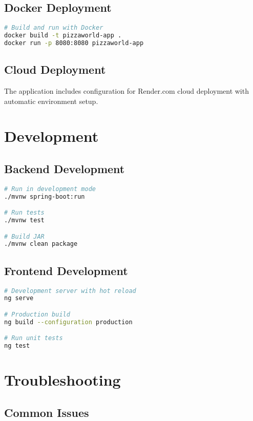 \documentclass[11pt,a4paper]{article}
\begin{document}
\subsection{Docker Deployment}
\begin{lstlisting}[language=bash, caption=Docker Deployment]
# Build and run with Docker
docker build -t pizzaworld-app .
docker run -p 8080:8080 pizzaworld-app
\end{lstlisting}

\subsection{Cloud Deployment}
The application includes configuration for Render.com cloud deployment with automatic environment setup.

\section{Development}

\subsection{Backend Development}
\begin{lstlisting}[language=bash, caption=Backend Development Commands]
# Run in development mode
./mvnw spring-boot:run

# Run tests
./mvnw test

# Build JAR
./mvnw clean package
\end{lstlisting}

\subsection{Frontend Development}
\begin{lstlisting}[language=bash, caption=Frontend Development Commands]
# Development server with hot reload
ng serve

# Production build
ng build --configuration production

# Run unit tests
ng test
\end{lstlisting}

\section{Troubleshooting}

\subsection{Common Issues}
\end{document}

